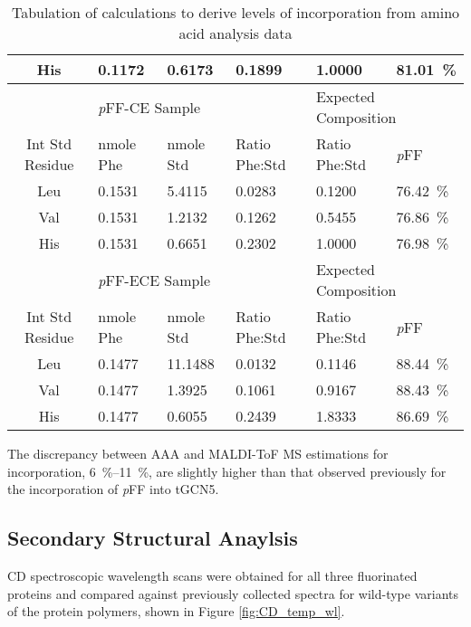 \begin{refsection}
\begin{table}[h!]
\begin{tabular}{ clllll }
  His & 0.1172 & 0.6173 & 0.1899 & 1.0000 & \SI{81.01}{\percent} \\
  \hline
  &
  \multicolumn{3}{l}{\emph{p}FF-CE Sample} &
  \multicolumn{2}{l}{Expected Composition} \\
  \hline
  Int Std Residue & nmole Phe & nmole Std & Ratio Phe:Std & Ratio Phe:Std& \emph{p}FF \\
  Leu & 0.1531 & 5.4115 & 0.0283 & 0.1200 & \SI{76.42}{\percent} \\
  Val & 0.1531 & 1.2132 & 0.1262 & 0.5455 & \SI{76.86}{\percent} \\
  His & 0.1531 & 0.6651 & 0.2302 & 1.0000 & \SI{76.98}{\percent} \\
  \hline
  &
  \multicolumn{3}{l}{\emph{p}FF-ECE Sample} &
  \multicolumn{2}{l}{Expected Composition} \\
  \hline
  Int Std Residue & nmole Phe & nmole Std & Ratio Phe:Std & Ratio Phe:Std& \emph{p}FF \\
  Leu & 0.1477 & 11.1488 & 0.0132 & 0.1146 & \SI{88.44}{\percent} \\
  Val & 0.1477 & 1.3925 & 0.1061 & 0.9167 & \SI{88.43}{\percent} \\
  His & 0.1477 & 0.6055 & 0.2439 & 1.8333 & \SI{86.69}{\percent} \\
  \hline
\end{tabular}
\caption{Tabulation of calculations to derive levels of incorporation from amino
acid analysis data}
\label{tab:aaa_analysis}
\end{table}
The discrepancy between AAA and MALDI-ToF MS estimations for incorporation,
\SIrange[range-phrase=--]{6}{11}{\percent}, are slightly higher than that
observed previously for the incorporation of \emph{p}FF into tGCN5.\cite{Voloshchuk2009}

\subsection{Secondary Structural Anaylsis}
CD spectroscopic wavelength scans were obtained for all three fluorinated
proteins and compared against previously collected spectra for wild-type
variants of the protein polymers, shown in Figure
\ref{fig:CD_temp_wl}.\cite{Haghpanah2009} 


\end{refsection}
